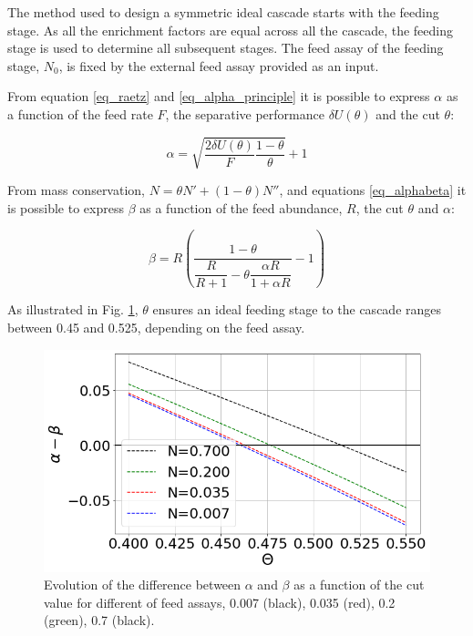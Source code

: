 The method used to design a symmetric ideal cascade starts with the feeding
stage. As all the enrichment factors are equal across all the cascade, the
feeding stage is used to determine all subsequent stages.
The feed assay of the feeding stage, $N_{0}$, is fixed by the external feed assay
provided as an input.

From equation \eqref{eq_raetz} and \eqref{eq_alpha_principle} it is possible to
express $\alpha$ as a function of the feed rate $F$, the separative performance
$\delta U(\theta)$ and the cut $\theta$:

\begin{equation} \label{eq_alpha}
    \alpha = \sqrt{\frac{2\delta U(\theta)}{F} \frac{1-\theta}{\theta}} + 1
\end{equation}


From mass conservation, $N = \theta N' + (1-\theta)N''$, and equations
\eqref{eq_alphabeta} it is possible to express $\beta$ as a function of the
feed abundance, $R$, the cut $\theta$ and $\alpha$:

\begin{equation}\label{eq_beta}
    \beta =   R \left(\dfrac{1-\theta}
                     {\dfrac{R}{R+1}- \theta \dfrac{\alpha R}{1+\alpha R}} -1\right)
\end{equation}


As illustrated in Fig. \ref{fig_a_m_b}, $\theta$ ensures an ideal feeding
stage to the cascade ranges between 0.45 and 0.525, depending on the feed assay.

\begin{figure}[h!] %
    \centering
    \includegraphics[scale=0.5]{alpha_minus_beta}
    \caption{Evolution of the difference between $\alpha$ and $\beta$ as a
    function of the cut value for different of feed assays, 0.007 (black),
    0.035 (red), 0.2 (green), 0.7 (black). }
    \label{fig_a_m_b}
\end{figure}


